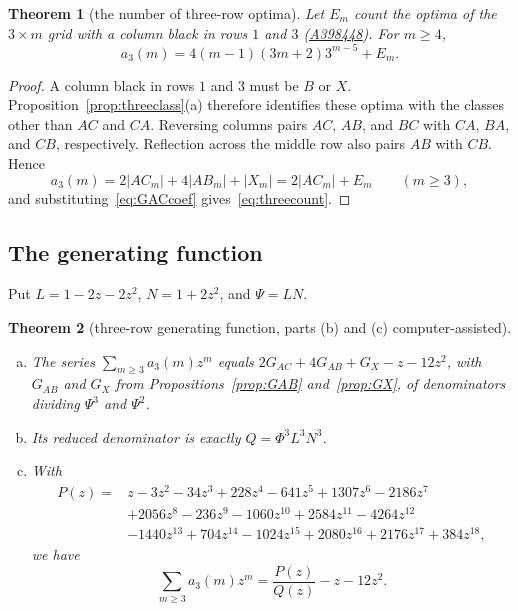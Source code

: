 \documentclass[12pt]{article}
\theoremstyle{plain}
\newtheorem{theorem}{Theorem}
\theoremstyle{definition}
\theoremstyle{remark}
\newcommand{\seqnum}[1]{\href{https://oeis.org/#1}{\rm \underline{#1}}}
\begin{document}
\begin{theorem}[the number of three-row optima]\label{thm:threecount}
Let $E_m$ count the optima of the $3\times m$ grid with a column black in rows $1$ and $3$
(\seqnum{A398448}). For $m\ge4$,
\begin{equation}\label{eq:threecount}
a_3(m)=4(m-1)(3m+2)3^{m-5}+E_m.
\end{equation}
\end{theorem}

\begin{proof}
A column black in rows $1$ and $3$ must be $B$ or $X$.
Proposition~\ref{prop:threeclass}(a) therefore identifies these optima
with the classes other than $AC$ and $CA$. Reversing columns pairs
$AC$, $AB$, and $BC$ with $CA$, $BA$, and $CB$, respectively.
Reflection across the middle row also pairs $AB$ with $CB$. Hence
\begin{equation}\label{eq:classsum}
a_3(m)=2|AC_m|+4|AB_m|+|X_m|=2|AC_m|+E_m\qquad(m\ge3),
\end{equation}
and substituting~\eqref{eq:GACcoef} gives~\eqref{eq:threecount}.
\end{proof}

\subsection{The generating function}

Put $L=1-2z-2z^2$, $N=1+2z^2$, and $\Psi=LN$.

\begin{theorem}[three-row generating function, parts (b) and (c) computer-assisted]\label{thm:threegf}
\leavevmode
\begin{enumerate}[(a)]
\item The series $\sum_{m\ge3}a_3(m)z^m$ equals $2G_{AC}+4G_{AB}+G_X-z-12z^2$, with
$G_{AB}$ and $G_X$ from Propositions~\ref{prop:GAB} and~\ref{prop:GX}, of denominators
dividing $\Psi^3$ and $\Psi^2$.
\item Its reduced denominator is exactly $Q=\Phi^3L^3N^3$.
\item With
\begin{align*}
P(z)={}&z-3z^2-34z^3+228z^4-641z^5+1307z^6-2186z^7\\
&+2056z^8-236z^9-1060z^{10}+2584z^{11}-4264z^{12}\\
&-1440z^{13}+704z^{14}-1024z^{15}+2080z^{16}+2176z^{17}+384z^{18},
\end{align*}
we have
\begin{equation}\label{eq:PQ}
\sum_{m\ge3}a_3(m)z^m=\frac{P(z)}{Q(z)}-z-12z^2.
\end{equation}
\end{enumerate}
\end{theorem}
\end{document}
